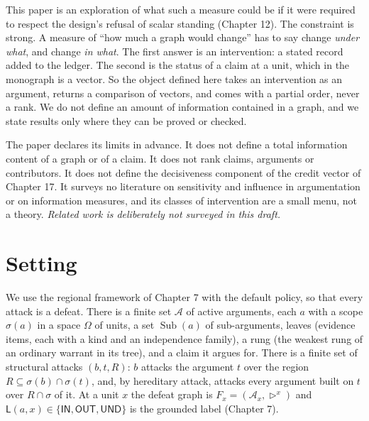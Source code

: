 \documentclass[11pt]{article}
\theoremstyle{plain}
\theoremstyle{definition}
\theoremstyle{remark}
\newcommand{\IN}{\textsf{IN}}
\newcommand{\OUT}{\textsf{OUT}}
\newcommand{\UND}{\textsf{UND}}
\newcommand{\Lab}{\mathsf{L}}
\newcommand{\Sub}{\operatorname{Sub}}
\newcommand{\dfeat}{\rhd}
\begin{document}
This paper is an exploration of what such a measure could be if it were required to respect the design's refusal of scalar standing (Chapter 12). The constraint is strong. A measure of ``how much a graph would change'' has to say change \emph{under what}, and change \emph{in what}. The first answer is an intervention: a stated record added to the ledger. The second is the status of a claim at a unit, which in the monograph is a vector. So the object defined here takes an intervention as an argument, returns a comparison of vectors, and comes with a partial order, never a rank. We do not define an amount of information contained in a graph, and we state results only where they can be proved or checked.

The paper declares its limits in advance. It does not define a total information content of a graph or of a claim. It does not rank claims, arguments or contributors. It does not define the decisiveness component of the credit vector of Chapter 17. It surveys no literature on sensitivity and influence in argumentation or on information measures, and its classes of intervention are a small menu, not a theory. \emph{Related work is deliberately not surveyed in this draft.}


\section{Setting}\label{sec:setting}

We use the regional framework of Chapter 7 with the default policy, so that every attack is a defeat. There is a finite set $\mathcal A$ of active arguments, each $a$ with a scope $\sigma(a)$ in a space $\Omega$ of units, a set $\Sub(a)$ of sub-arguments, leaves (evidence items, each with a kind and an independence family), a rung (the weakest rung of an ordinary warrant in its tree), and a claim it argues for. There is a finite set of structural attacks $(b,t,R)$: $b$ attacks the argument $t$ over the region $R\subseteq\sigma(b)\cap\sigma(t)$, and, by hereditary attack, attacks every argument built on $t$ over $R\cap\sigma$ of it. At a unit $x$ the defeat graph is $F_x=(\mathcal A_x,\dfeat^x)$ and $\Lab(a,x)\in\{\IN,\OUT,\UND\}$ is the grounded label (Chapter 7).
\end{document}
